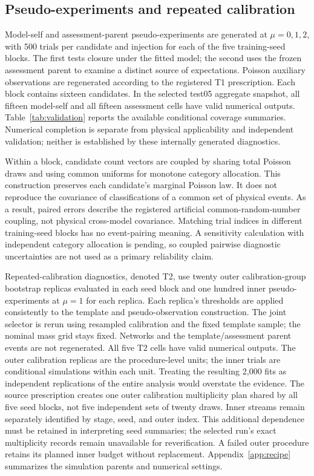 \documentclass[aps,prd,reprint,superscriptaddress,nofootinbib,longbibliography,floatfix]{revtex4-2}
\begin{document}
\subsection{Pseudo-experiments and repeated calibration}

Model-self and assessment-parent pseudo-experiments are generated at
$\mu=0,1,2$, with 500 trials per candidate and injection for each of the five
training-seed blocks. The first tests closure under the fitted model; the
second uses the frozen assessment parent to examine a distinct source of
expectations. Poisson auxiliary observations are regenerated according to
the registered T1 prescription. Each block contains sixteen candidates. In
the selected test05 aggregate snapshot, all fifteen model-self and all
fifteen assessment cells have valid numerical outputs. Table~\ref{tab:validation}
reports the available conditional coverage summaries. Numerical completion is
separate from physical applicability and independent validation; neither is
established by these internally generated diagnostics.

Within a block, candidate count vectors are coupled by sharing total
Poisson draws and using common uniforms for monotone category allocation.
This construction preserves each candidate's marginal Poisson law. It does
not reproduce the covariance of classifications of a common set of physical
events. As a result, paired errors describe the registered artificial
common-random-number coupling, not physical cross-model covariance.
Matching trial indices in different training-seed blocks has no event-pairing
meaning. A sensitivity calculation with independent category allocation is
pending, so coupled pairwise diagnostic uncertainties are not used as a
primary reliability claim.

Repeated-calibration diagnostics, denoted T2, use twenty outer
calibration-group bootstrap replicas evaluated in each seed block and one hundred inner
pseudo-experiments at $\mu=1$ for each replica. Each replica's thresholds
are applied consistently to the template and pseudo-observation
construction. The joint selector is rerun using resampled calibration and
the fixed template sample; the nominal mass grid stays fixed. Networks and
the template/assessment parent events are not regenerated. All five T2 cells
have valid numerical outputs. The outer calibration replicas are the
procedure-level units; the inner trials are conditional simulations within
each unit. Treating the resulting 2,000 fits as independent replications
of the entire analysis would overstate the evidence.
The source prescription creates one outer calibration multiplicity plan
shared by all five seed blocks, not five independent sets of twenty draws.
Inner streams remain separately identified by stage, seed, and outer index.
This additional dependence must be retained in interpreting seed summaries;
the selected run's exact multiplicity records remain unavailable for
reverification. A failed outer procedure retains its planned inner budget
without replacement. Appendix~\ref{app:recipe} summarizes the simulation
parents and numerical settings.
\end{document}
